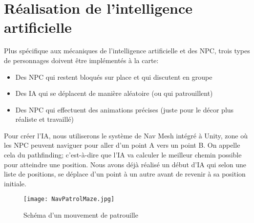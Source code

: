 \documentclass[../doc.tex]{subfiles}
\begin{document}
\section{Réalisation de l'intelligence artificielle}
Plus spécifique aux mécaniques de l'intelligence artificielle et des NPC,
 trois types de personnages doivent être implémentés à la carte:
\begin{itemize}
    \item Des NPC qui restent bloqués sur place et qui discutent en groupe
    \item Des IA qui se déplacent de manière aléatoire (ou qui patrouillent)
    \item Des NPC qui effectuent des animations précises
        (juste pour le décor plus réaliste et travaillé)
\end{itemize}

Pour créer l'IA, nous utiliserons le système de Nav Mesh intégré à Unity, zone où les NPC peuvent naviguer pour aller d'un point A vers un point B.
On appelle cela du pathfinding; c'est-à-dire que l'IA va calculer le meilleur chemin possible pour atteindre une position.
Nous avons déjà réalisé un début d'IA qui selon une liste de positions, se déplace d'un point à un autre avant de revenir à sa position initiale.

\begin{figure}[!htb]
    \centering
    \texttt{[image: NavPatrolMaze.jpg]}
    \caption{Schéma d'un mouvement de patrouille}
\end{figure}
\end{document}
